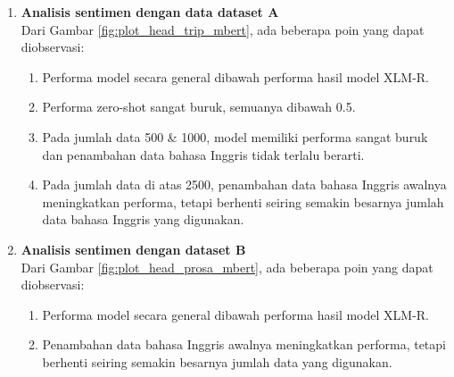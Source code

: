         \begin{enumerate}
            \item \textbf{Analisis sentimen dengan data dataset A} \\
            Dari Gambar \ref{fig:plot_head_trip_mbert}, ada beberapa poin yang dapat diobservasi:
            \begin{enumerate}
                \item Performa model secara general dibawah performa hasil model XLM-R.
                \item Performa zero-shot sangat buruk, semuanya dibawah 0.5.
                \item Pada jumlah data 500 \& 1000, model memiliki performa sangat buruk dan penambahan data bahasa Inggris tidak terlalu berarti.
                \item Pada jumlah data di atas 2500, penambahan data bahasa Inggris awalnya meningkatkan performa, tetapi berhenti seiring semakin besarnya jumlah data bahasa Inggris yang digunakan.
            \end{enumerate}

            

            \item \textbf{Analisis sentimen dengan dataset B} \\
            Dari Gambar \ref{fig:plot_head_prosa_mbert}, ada beberapa poin yang dapat diobservasi:
            \begin{enumerate}
                \item Performa model secara general dibawah performa hasil model XLM-R.
                \item Penambahan data bahasa Inggris awalnya meningkatkan performa, tetapi berhenti seiring semakin besarnya jumlah data yang digunakan.
            \end{enumerate}

        

\end{enumerate}
